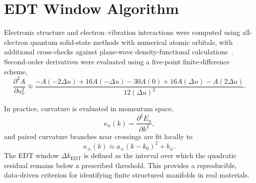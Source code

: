 \section{EDT Window Algorithm}

Electronic structure and electron--vibration interactions were computed using all-electron quantum solid-state methods with numerical atomic orbitals, with additional cross-checks against plane-wave density-functional calculations~\cite{Blum2009,Giannozzi2009,Giannozzi2017}. Second-order derivatives were evaluated using a five-point finite-difference scheme,
\begin{equation}
\frac{\partial^2 A}{\partial u_\nu^2}
\approx
\frac{-A(-2\Delta u) + 16A(-\Delta u) - 30A(0) + 16A(\Delta u) - A(2\Delta u)}{12(\Delta u)^2}.
\end{equation}

In practice, curvature is evaluated in momentum space,
\begin{equation}
\kappa_n(k) = \frac{\partial^2 E_n}{\partial k^2},
\end{equation}
and paired curvature branches near crossings are fit locally to
\begin{equation}
\kappa_\pm(k) \approx a_\pm (k-k_0)^2 + b_\pm .
\end{equation}
The EDT window $\Delta k_{\mathrm{EDT}}$ is defined as the interval over which the quadratic residual remains below a prescribed threshold. This provides a reproducible, data-driven criterion for identifying finite structured manifolds in real materials.
